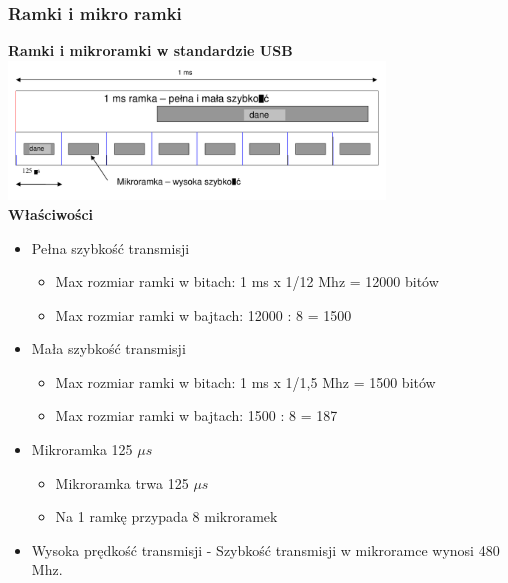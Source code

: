 \documentclass[a4paper,twoside]{article}
\begin{document}
		\subsubsection{Ramki i mikro ramki}
			\textbf{Ramki i mikroramki w standardzie USB}\\
			\includegraphics[width=10cm]{./wyklady/USB_11_1.pdf}\\
			\textbf{Właściwości}
			\begin{itemize}
				\item Pełna szybkość transmisji
				\begin{itemize}
					\item Max rozmiar ramki w bitach: 1 ms x 1/12 Mhz = 12000 bitów
					\item Max rozmiar ramki w bajtach: 12000 : 8 = 1500
				\end{itemize}
				\item Mała szybkość transmisji
				\begin{itemize}
					\item Max rozmiar ramki w bitach: 1 ms x 1/1,5 Mhz = 1500 bitów
					\item Max rozmiar ramki w bajtach: 1500 : 8 = 187
				\end{itemize}
				\item Mikroramka 125 $\mu s$
				\begin{itemize}
					\item Mikroramka trwa 125 $\mu s$
					\item Na 1 ramkę przypada 8 mikroramek
				\end{itemize}
				\item Wysoka prędkość transmisji - Szybkość transmisji w mikroramce wynosi 480 Mhz.
			\end{itemize}
\end{document}
